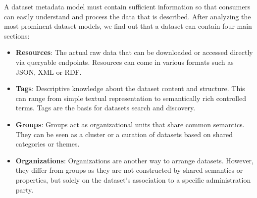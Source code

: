 \documentclass[a4paper,11pt,twoside]{ThesisStyle}
\begin{document}
A dataset metadata model must contain sufficient information so that consumers can easily understand and process the data that is described. After analyzing the most prominent dataset models, we find out that a dataset can contain four main sections:
\begin{itemize}
  \item \textbf{Resources}: The actual raw data that can be downloaded or accessed directly via queryable endpoints. Resources can come in various formats such as JSON, XML or RDF.
  \item \textbf{Tags}: Descriptive knowledge about the dataset content and structure. This can range from simple textual representation to semantically rich controlled terms. Tags are the basis for datasets search and discovery.
  \item \textbf{Groups}: Groups act as organizational units that share common semantics. They can be seen as a cluster or a curation of datasets based on shared categories or themes.
  \item \textbf{Organizations}: Organizations are another way to arrange datasets. However, they differ from groups as they are not constructed by shared semantics or properties, but solely on the dataset's association to a specific administration party.
\end{itemize}
\end{document}
